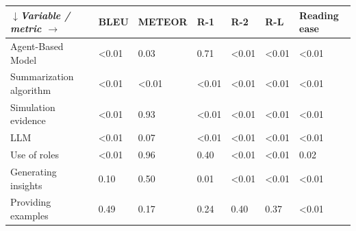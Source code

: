 \begin{tabular}{|l|l|l|l|l|l|l|}
\hline
\textit{$\downarrow$Variable / metric $\rightarrow$} & BLEU & METEOR & R-1 & R-2 & R-L & Reading ease \\
 \hline
 Agent-Based Model & \textless{}0.01 & 0.03 & 0.71 & \textless{}0.01 & \textless{}0.01 & \textless{}0.01 \\
 \hline
 Summarization algorithm & \textless{}0.01 & \textless{}0.01 & \textless{}0.01 & \textless{}0.01 & \textless{}0.01 & \textless{}0.01 \\
 \hline
 Simulation evidence & \textless{}0.01 & 0.93 & \textless{}0.01 & \textless{}0.01 & \textless{}0.01 & \textless{}0.01 \\
 \hline
 LLM & \textless{}0.01 & 0.07 & \textless{}0.01 & \textless{}0.01 & \textless{}0.01 & \textless{}0.01 \\
 \hline
 Use of roles & \textless{}0.01 & 0.96 & 0.40 & \textless{}0.01 & \textless{}0.01 & 0.02 \\
 \hline
 Generating insights & 0.10 & 0.50 & 0.01 & \textless{}0.01 & \textless{}0.01 & \textless{}0.01 \\
 \hline
 Providing examples & 0.49 & 0.17 & 0.24 & 0.40 & 0.37 & \textless{}0.01 \\
\hline
\end{tabular}
